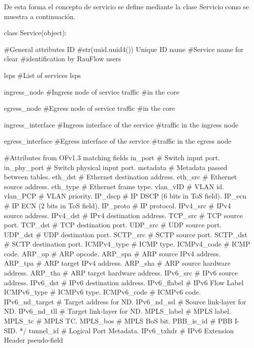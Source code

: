 De esta forma el concepto de servicio se define mediante la clase Servicio como se muestra a continuación.

\begin{python}
class Service(object):

		#General attributes
		ID 				    #str(uuid.uuid4()) Unique ID 
		name 				#Service name for clear 
							#identification by RauFlow users
							
		lsps				#List of services lsps
		
		ingress_node		#Ingress node of service traffic 
							#in the core
							
		egress_node 		#Egress node of service traffic 
							#in the core
							
		ingress_interface 	#Ingress interface of the service 
							#traffic in the ingress node
							
		egress_interface 	#Egress interface of the service 
							#traffic in the egress node
        
		#Attributes from OFv1.3 matching fields
		in_port			# Switch input port.
		in_phy_port 	# Switch physical input port. 
		metadata 		# Metadata passed between tables. 
		eth_dst 		# Ethernet destination address.
		eth_src 		# Ethernet source address. 
		eth_type 		# Ethernet frame type. 
		vlan_vID 		# VLAN id. 
		vlan_PCP		# VLAN priority. 
		IP_dscp 		# IP DSCP (6 bits in ToS field). 
		IP_ecn  		# IP ECN (2 bits in ToS field). 
		IP_proto		# IP protocol. 
		IPv4_src 		# IPv4 source address. 
		IPv4_dst 		# IPv4 destination address. 
		TCP_src 		# TCP source port. 
		TCP_dst 		# TCP destination port. 
		UDP_src 		# UDP source port. 
		UDP_dst 		# UDP destination port. 
		SCTP_src 		# SCTP source port. 
		SCTP_dst 		# SCTP destination port. 
		ICMPv4_type 	# ICMP type. 
		ICMPv4_code 	# ICMP code. 
		ARP_op			# ARP opcode. 
		ARP_spa 		# ARP source IPv4 address. 
		ARP_tpa 		# ARP target IPv4 address. 
		ARP_sha 		# ARP source hardware address. 
		ARP_tha 		# ARP target hardware address. 
		IPv6_src 		# IPv6 source address. 
		IPv6_dst 		# IPv6 destination address. 
		IPv6_flabel 	# IPv6 Flow Label 
		ICMPv6_type 	# ICMPv6 type. 
		ICMPv6_code 	# ICMPv6 code. 
		IPv6_nd_target 	# Target address for ND. 
		IPv6_nd_ssl 	# Source link-layer for ND. 
		IPv6_nd_tll  	# Target link-layer for ND. 
		MPLS_label 		# MPLS label. 
		MPLS_tc 		# MPLS TC. 
		MPLS_bos		# MPLS BoS bit. 
		PBB_is_id 		# PBB I-SID. */
		tunnel_id 		# Logical Port Metadata. 
		IPv6_txhdr 		# IPv6 Extension Header pseudo-field 
		
\end{python}


